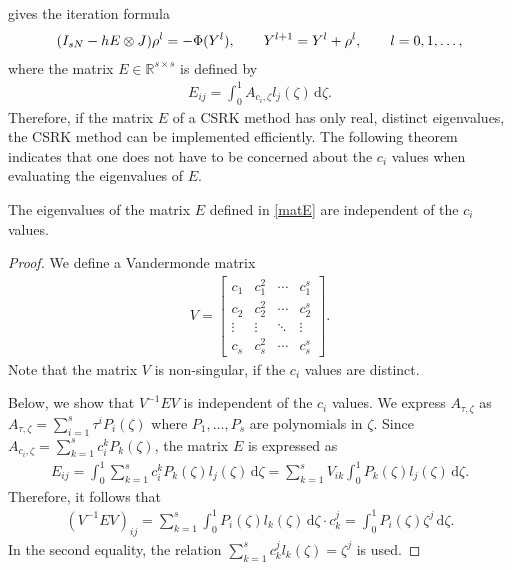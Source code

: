\documentclass[final,leqno,onefignum,onetabnum]{siamltex1213}
\DeclarePairedDelimiter\paren{\lparen}{\rparen}
\begin{document}
gives the iteration formula
\begin{align}
\paren*{I_{sN} - h E \otimes J } \rho^l = - \Phi (Y^l), \qquad
Y^{l+1} = Y^l + \rho^l , \qquad l =0,1,\dots ,
\end{align}
where the matrix $E\in\mathbb{R}^{s\times s}$ is defined by
\begin{align}\label{matE}
E_{ij} =  \int_0^1 A_{c_i,\zeta} l_j(\zeta)\,{\mathrm d}\zeta.
\end{align}
Therefore, if the matrix $E$ of a CSRK method has only real, distinct eigenvalues,
the CSRK method can be implemented efficiently.
The following theorem indicates that one does not have to be
concerned about the $c_i$ values
when evaluating the eigenvalues of $E$.

\begin{theorem}\label{th:eiE}
The eigenvalues of the matrix $E$ defined in \eqref{matE} are
independent of the $c_i$ values.
\end{theorem}

\begin{proof}
We define a Vandermonde matrix
\begin{align*}
V = \begin{bmatrix}
c_1 & c_1^2 & \cdots & c_1^s \\
c_2 & c_2^2 & \cdots & c_2^s \\
\vdots & \vdots & \ddots & \vdots \\
c_s & c_s^2 & \cdots & c_s^s 
\end{bmatrix}.
\end{align*}
Note that the matrix $V$ is non-singular, if the $c_i$ values are distinct. 

Below, we show that $V^{-1}EV$ is independent of the $c_i$ values.
We express $A_{\tau,\zeta}$ as $A_{\tau,\zeta} = \sum_{i=1}^s \tau^i P_i (\zeta)$
where $P_1,\dots,P_s$ are polynomials in $\zeta$.
Since
$
A_{c_i,\zeta} = \sum_{k=1}^s c_i^k P_k(\zeta)
$,
the matrix $E$ is expressed as
\begin{align*}
E_{ij} = \int_0^1 \sum_{k=1}^s c_i^k  P_k(\zeta) l _j (\zeta)\,{\mathrm d} \zeta 
=
\sum_{k=1}^s V_{ik} \int_0^1  P_k(\zeta) l _j (\zeta)\,{\mathrm d} \zeta .
\end{align*}
Therefore, it follows that
\begin{align}
(V^{-1}EV)_{ij} 
=\sum_{k=1}^s \int_0^1 P_i(\zeta) l_k(\zeta)\,{\mathrm d} \zeta
\cdot c_k^j
=\int_0^1 P_i (\zeta) \zeta^j \,{\mathrm d} \zeta.
\label{eq:TET}
\end{align}
In the second equality, the relation
$\sum_{k=1}^s c_k^j l _k(\zeta)= \zeta^j$
is used.
\end{proof}
\end{document}
